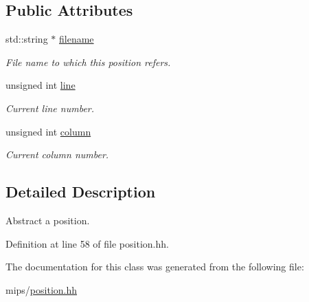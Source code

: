 \subsection*{Public Attributes}
\begin{DoxyCompactItemize}
\item 
\hypertarget{classyy_1_1position_a103516c74125239f38b5c2bba4748230}{std\-::string $\ast$ \hyperlink{classyy_1_1position_a103516c74125239f38b5c2bba4748230}{filename}}\label{classyy_1_1position_a103516c74125239f38b5c2bba4748230}

\begin{DoxyCompactList}\small\item\em File name to which this position refers. \end{DoxyCompactList}\item 
\hypertarget{classyy_1_1position_aa3806654fd62786a0446a461d55755d6}{unsigned int \hyperlink{classyy_1_1position_aa3806654fd62786a0446a461d55755d6}{line}}\label{classyy_1_1position_aa3806654fd62786a0446a461d55755d6}

\begin{DoxyCompactList}\small\item\em Current line number. \end{DoxyCompactList}\item 
\hypertarget{classyy_1_1position_ada60c2dbba2e05705265f8359f722c4f}{unsigned int \hyperlink{classyy_1_1position_ada60c2dbba2e05705265f8359f722c4f}{column}}\label{classyy_1_1position_ada60c2dbba2e05705265f8359f722c4f}

\begin{DoxyCompactList}\small\item\em Current column number. \end{DoxyCompactList}\end{DoxyCompactItemize}


\subsection{Detailed Description}
Abstract a position. 

Definition at line 58 of file position.\-hh.



The documentation for this class was generated from the following file\-:\begin{DoxyCompactItemize}
\item 
mips/\hyperlink{position_8hh}{position.\-hh}\end{DoxyCompactItemize}
